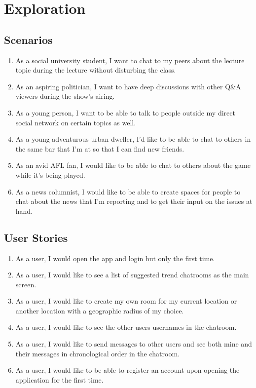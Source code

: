 \documentclass[11pt,english,numbers=endperiod,parskip=half]{scrartcl}
\begin{document}
\section{Exploration}
  \subsection{Scenarios}
    \begin{enumerate}
      \item{
        As a social university student, I want to chat to my peers about the
        lecture topic during the lecture without disturbing the class.
      }
      \item{
        As an aspiring politician, I want to have deep discussions with other
        Q\&A viewers during the show's airing.
      }
      \item{
        As a young person, I want to be able to talk to people outside my direct
        social network on certain topics as well.
      }
      \item{
        As a young adventurous urban dweller, I'd like to be able to chat
        to others in the same bar that I'm at so that I can find new friends.
      }
      \item{
        As an avid AFL fan, I would like to be able to chat to others about the
        game while it's being played.
      }
      \item{
        As a news columnist, I would like to be able to create spaces for people
        to chat about the news that I'm reporting and to get their input on the
        issues at hand.
      }
    \end{enumerate}

  \subsection{User Stories}
    \begin{enumerate}
      \item{
        As a user, I would open the app and login but only the first time.
      }
      \item{
        As a user, I would like to see a list of suggested trend chatrooms as
        the main screen.
      }
      \item{
        As a user, I would like to create my own room for my current location or
        another location with a geographic radius of my choice.
      }
      \item{
        As a user, I would like to see the other users usernames in the chatroom.
      }
      \item{
        As a user, I would like to send messages to other users and see both
        mine and their messages in chronological order in the chatroom.
      }
      \item{
        As a user, I would like to be able to register an account upon opening
        the application for the first time.
      }
    \end{enumerate}
\end{document}
